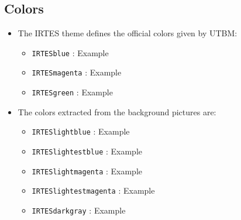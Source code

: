 \documentclass[english,circlenumberstyle]{irtesbeamer}
\begin{document}
\subsection{Colors}
\begin{frame}{\subsecname}
	\begin{itemize}
	\item The IRTES theme defines the official colors given by UTBM:
		\begin{itemize}
		\item \texttt{IRTESblue} : \textcolor{IRTESblue}{Example}
		\item \texttt{IRTESmagenta} : \textcolor{IRTESmagenta}{Example}
		\item \texttt{IRTESgreen} : \textcolor{IRTESgreen}{Example}
		\end{itemize}
	\item The colors extracted from the background pictures are:
		\begin{itemize}
		\item \texttt{IRTESlightblue} : \textcolor{IRTESlightblue}{Example}
		\item \texttt{IRTESlightestblue} : \textcolor{IRTESlightestblue}{Example}
		\item \texttt{IRTESlightmagenta} : \textcolor{IRTESlightmagenta}{Example}
		\item \texttt{IRTESlightestmagenta} : \textcolor{IRTESlightestmagenta}{Example}
		\item \texttt{IRTESdarkgray} : \textcolor{IRTESdarkgray}{Example}
		\end{itemize}
	\end{itemize}
\end{frame}
\end{document}
